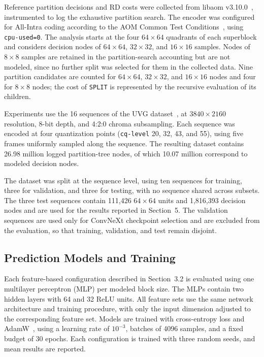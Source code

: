 \documentclass{article}
\begin{document}
Reference partition decisions and RD costs were collected from libaom v3.10.0~\cite{aomedia2024libaom}, instrumented to log the exhaustive partition search. The encoder was configured for All-Intra coding according to the AOM Common Test Conditions~\cite{zhao2026aomctc}, using \texttt{cpu-used=0}. The analysis starts at the four $64\times64$ quadrants of each superblock and considers decision nodes of $64\times64$, $32\times32$, and $16\times16$ samples. Nodes of $8\times8$ samples are retained in the partition-search accounting but are not modeled, since no further split was selected for them in the collected data. Nine partition candidates are counted for $64\times64$, $32\times32$, and $16\times16$ nodes and four for $8\times8$ nodes; the cost of \texttt{SPLIT} is represented by the recursive evaluation of its children.

Experiments use the 16 sequences of the UVG dataset~\cite{mercat2020uvgdataset}, at $3840\times2160$ resolution, 8-bit depth, and 4:2:0 chroma subsampling. Each sequence was encoded at four quantization points (\texttt{cq-level} 20, 32, 43, and 55), using five frames uniformly sampled along the sequence. The resulting dataset contains 26.98 million logged partition-tree nodes, of which 10.07 million correspond to modeled decision nodes.

The dataset was split at the sequence level, using ten sequences for training, three for validation, and three for testing, with no sequence shared across subsets. The three test sequences contain 111,426 $64\times64$ units and 1,816,393 decision nodes and are used for the results reported in Section~5. The validation sequences are used only for ConvNeXt checkpoint selection and are excluded from the evaluation, so that training, validation, and test remain disjoint.

\subsection{Prediction Models and Training}

Each feature-based configuration described in Section~3.2 is evaluated using one multilayer perceptron (MLP) per modeled block size. The MLPs contain two hidden layers with 64 and 32 ReLU units. All feature sets use the same network architecture and training procedure, with only the input dimension adjusted to the corresponding feature set. Models are trained with cross-entropy loss and AdamW~\cite{loshchilov2019adamw}, using a learning rate of $10^{-3}$, batches of 4096 samples, and a fixed budget of 30 epochs. Each configuration is trained with three random seeds, and mean results are reported.
\end{document}
